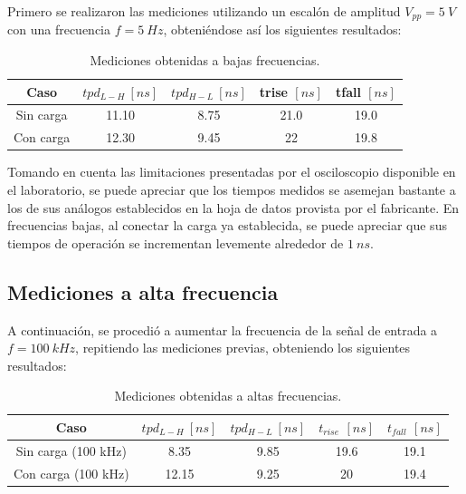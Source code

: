 Primero se realizaron las mediciones utilizando un escalón de amplitud $V_{pp}=5 \ V$ con una frecuencia $f=5 \ Hz$, obteniéndose así los siguientes resultados:
\begin{table}[H]
\centering
\begin{tabular}{ccccc}
\hline
Caso & $tpd_{L-H} \ [ns]$ & $tpd_{H-L} \ [ns]$ & trise $[ns]$ & tfall $[ns]$ \\ \hline
Sin carga & 11.10 & 8.75 & 21.0 & 19.0 \\
Con carga & 12.30 & 9.45 & 22 & 19.8 \\ \hline
\end{tabular}
\caption{Mediciones obtenidas a bajas frecuencias.}
\label{tb:bf}
\end{table}

Tomando en cuenta las limitaciones presentadas por el osciloscopio disponible en el laboratorio, se puede apreciar que los tiempos medidos se asemejan bastante a los de sus análogos establecidos en la hoja de datos provista por el fabricante. En frecuencias bajas, al conectar la carga ya establecida, se puede apreciar que sus tiempos de operación se incrementan levemente alrededor de $1 \ ns$. 

\subsection{Mediciones a alta frecuencia}
A continuación, se procedió a aumentar la frecuencia de la señal de entrada a $f=100 \ kHz$, repitiendo las mediciones previas, obteniendo los siguientes resultados:
\begin{table}[H]
\centering
\begin{tabular}{ccccc}
\hline
Caso & $tpd_{L-H} \ [ns]$ & $tpd_{H-L} \ [ns]$ & $t_{rise}$ $[ns]$ & $t_{fall}$ $[ns]$ \\ \hline
Sin carga (100 kHz) & 8.35 & 9.85 & 19.6 & 19.1 \\
Con carga (100 kHz) & 12.15 & 9.25 & 20 & 19.4 \\ \hline
\end{tabular}
\caption{Mediciones obtenidas a altas frecuencias.}
\label{tb:af}
\end{table}

